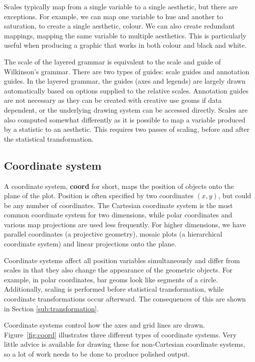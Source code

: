 Scales typically map from a single variable to a single aesthetic, but there are exceptions.  For example, we can map one variable to hue and another to saturation, to create a single aesthetic, colour.  We can also create redundant mappings, mapping the same variable to multiple aesthetics.  This is particularly useful when producing a graphic that works in both colour and black and white. 

The scale of the layered grammar is equivalent to the {\sc scale} and {\sc guide} of Wilkinson's grammar. There are two types of guides: scale guides and annotation guides.  In the layered grammar, the guides (axes and legends) are largely drawn automatically based on options supplied to the relative scales.   Annotation guides are not necessary as they can be created with creative use geoms if data dependent, or the underlying drawing system can be accessed directly.  Scales are also computed somewhat differently as it is possible to map a variable produced by a statistic to an aesthetic.  This requires two passes of scaling, before and after the statistical transformation.

\subsection{Coordinate system}\label{sec:coordinate_systems}

A coordinate system, {\bf coord} for short, maps the position of objects onto the plane of the plot.  Position is often specified by two coordinates $(x, y)$, but could be any number of coordinates.  The Cartesian coordinate system is the most common coordinate system for two dimensions, while polar coordinates and various map projections are used less frequently.  For higher dimensions, we have parallel coordinates (a projective geometry), mosaic plots (a hierarchical coordinate system) and linear projections onto the plane.

Coordinate systems affect all position variables simultaneously and differ from scales in that they also change the appearance of the geometric objects.  For example, in polar coordinates, bar geoms look like segments of a circle.  Additionally, scaling is performed before statistical transformation, while coordinate transformations occur afterward.  The consequences of this are shown in Section \ref{sub:transformation}.

Coordinate systems control how the axes and grid lines are drawn.  Figure~\ref{fig:coord} illustrates three different types of coordinate systems.  Very little advice is available for drawing these for non-Cartesian coordinate systems, so a lot of work needs to be done to produce polished output.

